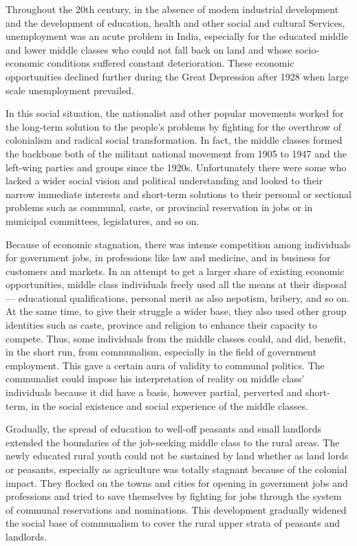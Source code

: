 Throughout the 20th century, in the absence of modem industrial development and the development of education, health and other social and cultural Services, unemployment was an acute problem in India, especially for the educated middle and lower middle classes who could not fall back on land and whose socio-economic conditions suffered constant deterioration. These economic opportunities declined further during the Great Depression after 1928 when large scale unemployment prevailed. 

In this social situation, the nationalist and other popular movements worked for the long-term solution to the people's problems by fighting for the overthrow of colonialism and radical social transformation. In fact, the middle classes formed the backbone both of the militant national movement from 1905 to 1947 and the left-wing parties and groups since the 1920s. Unfortunately there were some who lacked a wider social vision and political understanding and looked to their narrow immediate interests and short-term solutions to their personal or sectional problems such as communal, caste, or provincial reservation in jobs or in municipal committees, legislatures, and so on. 

Because of economic stagnation, there was intense competition among individuals for government jobs, in professions like law and medicine, and in business for customers and markets. In an attempt to get a larger share of existing economic opportunities, middle class individuals freely used all the means at their disposal — educational qualifications, personal merit as also nepotism, bribery, and so on. At the same time, to give their struggle a wider base, they also used other group identities such as caste, province and religion to enhance their capacity to compete. Thus, some individuals from the middle classes could, and did, benefit, in the short run, from communalism, especially in the field of government employment. This gave a certain aura of validity to communal politics. The communalist could impose his interpretation of reality on middle class' individuals because it did have a basis, however partial, perverted and short-term, in the social existence and social experience of the middle classes. 

Gradually, the spread of education to well-off peasants and small landlords extended the boundaries of the job-seeking middle class to the rural areas. The newly educated rural youth could not be sustained by land whether as land lords or peasants, especially as agriculture was totally stagnant because of the colonial impact. They flocked on the towns and cities for opening in government jobs and professions and tried to save themselves by fighting for jobs through the system of communal reservations and nominations. This development gradually widened the social base of communalism to cover the rural upper strata of peasants and landlords. 

